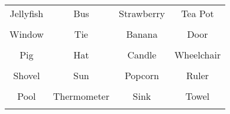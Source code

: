 \documentclass[12pt,a4paper]{article}
\begin{document}
\thispagestyle{empty}
\begin{table}[]
\centering
\Huge
\begin{tabular}{cccc}
 Jellyfish& Bus& Strawberry& Tea Pot\\  & & & \\
 Window& Tie& Banana& Door\\  & & & \\
 Pig& Hat& Candle& Wheelchair\\  & & & \\
 Shovel& Sun& Popcorn& Ruler\\  & & & \\
 Pool& Thermometer& Sink& Towel\\  & & & \\
\end{tabular}
\end{table}
\end{document}

